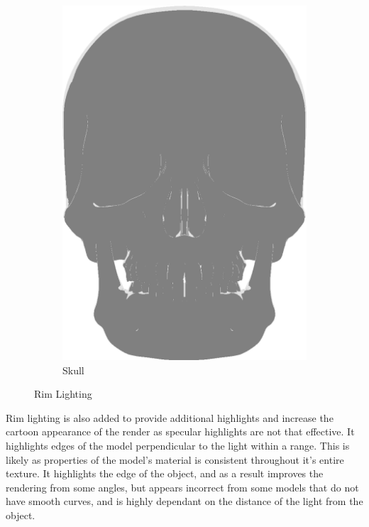 \begin{figure}[h]
\begin{subfigure}[b]{0.25\textwidth}
    \includegraphics[width=\textwidth]{img/Lighting/RimSkull.png}
    \caption{Skull}
    \label{fig:RimSkull}
    \end{subfigure}
    \caption{Rim Lighting}
    \label{fig:RimLighting}
\end{figure}

Rim lighting is also added to provide additional highlights and increase the cartoon appearance of the render as specular highlights are not that effective. It highlights edges of the model perpendicular to the light within a range. This is likely as properties of the model's material is consistent throughout it's entire texture. It highlights the edge of the object, and as a result improves the rendering from some angles, but appears incorrect from some models that do not have smooth curves, and is highly dependant on the distance of the light from the object. 

